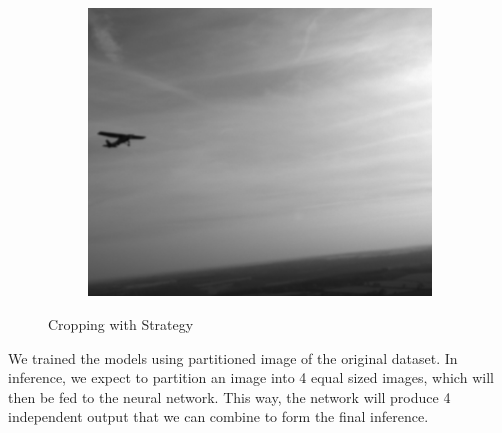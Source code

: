 {\begin{figure}[p]
\begin{subfigure}[][][t]{0.3\textwidth}
      \includegraphics[width=1\linewidth]{figures/crop_strat_legal3.png}
  \end{subfigure}
  \caption{Cropping with Strategy}
  \label{fig:crop-legal}
\end{figure}
}
We trained the models using partitioned image of the original dataset.
In inference, we expect to partition an image into 4 equal sized images, which will
then be fed to the neural network. This way, the network will produce 4 independent
output that we can combine to form the final inference.

